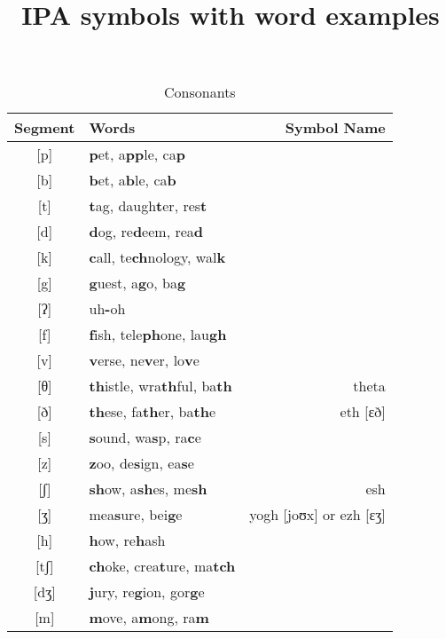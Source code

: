 \documentclass{article}
\title{IPA symbols with word examples}
\date{}
\begin{document}
  \maketitle
  \begin{table}[htb]
    \caption{Consonants}
    \centering
    \vspace{0.5cm}
    \begin{tabular}{c | l r}
      Segment & Words & Symbol Name \\
      \hline
      {[}p{]} & \textbf{p}et, a\textbf{pp}le, ca\textbf{p}          & \\
      {[}b{]}  & \textbf{b}et, a\textbf{b}le, ca\textbf{b}          & \\
      {[}t{]}  & \textbf{t}ag, daugh\textbf{t}er, res\textbf{t}     & \\
      {[}d{]}  & \textbf{d}og, re\textbf{d}eem, rea\textbf{d}       & \\
      {[}k{]}  & \textbf{c}all, te\textbf{ch}nology, wal\textbf{k}  & \\
      {[}g{]}  & \textbf{g}uest, a\textbf{g}o, ba\textbf{g}         & \\
      {[}ʔ{]}  & uh\textbf{-}oh                                     & \\
      {[}f{]}  & \textbf{f}ish, tele\textbf{ph}one, lau\textbf{gh}  & \\
      {[}v{]}  & \textbf{v}erse, ne\textbf{v}er, lo\textbf{v}e      & \\
      {[}θ{]}  & \textbf{th}istle, wra\textbf{th}ful, ba\textbf{th} & theta\\
      {[}ð{]}  & \textbf{th}ese, fa\textbf{th}er, ba\textbf{th}e    & eth {[}ɛð{]}\\
      {[}s{]}  & \textbf{s}ound, wa\textbf{s}p, ra\textbf{c}e       & \\
      {[}z{]}  & \textbf{z}oo, de\textbf{s}ign, ea\textbf{s}e       & \\
      {[}ʃ{]}  & \textbf{sh}ow, a\textbf{sh}es, me\textbf{sh}       & esh \\
      {[}ʒ{]}  & mea\textbf{s}ure, bei\textbf{g}e                   & yogh {[}joʊx{]} or ezh {[}ɛʒ{]}\\
      {[}h{]}  & \textbf{h}ow, re\textbf{h}ash                      & \\
      {[}tʃ{]} & \textbf{ch}oke, crea\textbf{t}ure, ma\textbf{tch}  & \\
      {[}dʒ{]} & \textbf{j}ury, re\textbf{g}ion, gor\textbf{g}e     & \\
      {[}m{]}  & \textbf{m}ove, a\textbf{m}ong, ra\textbf{m}        & \\

\end{tabular}
\end{table}
\end{document}
